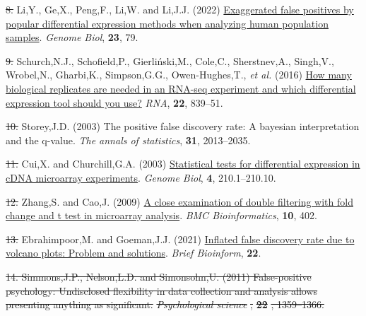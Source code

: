 \documentclass[
]{article}
\newlength{\cslhangindent}
\newenvironment{CSLReferences}[2] %
 {\begin{list}{}{%
  \setlength{\itemindent}{0pt}
  \setlength{\leftmargin}{0pt}
  \setlength{\parsep}{0pt}
  \ifodd #1
   \setlength{\leftmargin}{\cslhangindent}
   \setlength{\itemindent}{-1\cslhangindent}
  \fi
  \setlength{\itemsep}{#2\baselineskip}}}
 {\end{list}}
\providecommand{\DIFadd}[1]{{\protect\color{blue}\uwave{#1}}} %
\providecommand{\DIFdel}[1]{{\protect\color{red}\sout{#1}}}                      %
\providecommand{\DIFaddbegin}{} %
\providecommand{\DIFaddend}{} %
\providecommand{\DIFdelbegin}{} %
\providecommand{\DIFdelend}{} %
\newcommand{\DIFscaledelfig}{0.5}
\newlength{\DIFdelgraphicswidth} %
\newlength{\DIFdelgraphicsheight} %
\newcommand{\DIFaddincludegraphics}[2][]{{\color{blue}\fbox{\DIFOincludegraphics[#1]{#2}}}} %
\newcommand{\DIFdelincludegraphics}[2][]{%
\sbox{\DIFdelgraphicsbox}{\DIFOincludegraphics[#1]{#2}}%
\settoboxwidth{\DIFdelgraphicswidth}{\DIFdelgraphicsbox} %
\settoboxtotalheight{\DIFdelgraphicsheight}{\DIFdelgraphicsbox} %
\scalebox{\DIFscaledelfig}{%
\parbox[b]{\DIFdelgraphicswidth}{\usebox{\DIFdelgraphicsbox}\\[-\baselineskip] \rule{\DIFdelgraphicswidth}{0em}}\llap{\resizebox{\DIFdelgraphicswidth}{\DIFdelgraphicsheight}{%
\setlength{\unitlength}{\DIFdelgraphicswidth}%
\begin{picture}(1,1)%
\thicklines\linethickness{2pt} %
{\color[rgb]{1,0,0}\put(0,0){\framebox(1,1){}}}%
{\color[rgb]{1,0,0}\put(0,0){\line( 1,1){1}}}%
{\color[rgb]{1,0,0}\put(0,1){\line(1,-1){1}}}%
\end{picture}%
}\hspace*{3pt}}} %
} %
\DeclareRobustCommand{\DIFaddbegin}{\DIFOaddbegin \let\includegraphics\DIFaddincludegraphics} %
\DeclareRobustCommand{\DIFaddend}{\DIFOaddend \let\includegraphics\DIFOincludegraphics} %
\DeclareRobustCommand{\DIFdelbegin}{\DIFOdelbegin \let\includegraphics\DIFdelincludegraphics} %
\DeclareRobustCommand{\DIFdelend}{\DIFOaddend \let\includegraphics\DIFOincludegraphics} %
\begin{document}
\begin{CSLReferences}{1}{1}
\DIFdelbegin \DIFdel{8. }\DIFdelend \DIFaddbegin \DIFadd{13. }\DIFaddend Li,Y., Ge,X., Peng,F., Li,W. and Li,J.J. (2022)
\href{https://doi.org/10.1186/s13059-022-02648-4}{Exaggerated false
positives by popular differential expression methods when analyzing
human population samples}. \emph{Genome Biol}, \textbf{23}, 79.

\DIFdelbegin \DIFdel{9. }\DIFdelend \DIFaddbegin \DIFadd{14. }\DIFaddend Schurch,N.J., Schofield,P., Gierliński,M., Cole,C., Sherstnev,A.,
Singh,V., Wrobel,N., Gharbi,K., Simpson,G.G., Owen-Hughes,T., \emph{et
al.} (2016) \href{https://doi.org/10.1261/rna.053959.115}{How many
biological replicates are needed in an RNA-seq experiment and which
differential expression tool should you use?} \emph{RNA}, \textbf{22},
839--51.

\DIFdelbegin \DIFdel{10. }\DIFdelend \DIFaddbegin \DIFadd{15. }\DIFaddend Storey,J.D. (2003) The positive false discovery rate: A bayesian
interpretation and the q-value. \emph{The annals of statistics},
\textbf{31}, 2013--2035.

\DIFdelbegin \DIFdel{11. }\DIFdelend \DIFaddbegin \DIFadd{16. }\DIFaddend Cui,X. and Churchill,G.A. (2003)
\href{https://www.ncbi.nlm.nih.gov/pubmed/12702200}{Statistical tests
for differential expression in cDNA microarray experiments}.
\emph{Genome Biol}, \textbf{4}, 210.1--210.10.

\DIFdelbegin \DIFdel{12. }\DIFdelend \DIFaddbegin \DIFadd{17. }\DIFaddend Zhang,S. and Cao,J. (2009)
\href{https://doi.org/10.1186/1471-2105-10-402}{A close examination of
double filtering with fold change and t test in microarray analysis}.
\emph{BMC Bioinformatics}, \textbf{10}, 402.

\DIFdelbegin \DIFdel{13. }\DIFdelend \DIFaddbegin \DIFadd{18. }\DIFaddend Ebrahimpoor,M. and Goeman,J.J. (2021)
\href{https://doi.org/10.1093/bib/bbab053}{Inflated false discovery rate
due to volcano plots: Problem and solutions}. \emph{Brief Bioinform},
\textbf{22}.

\DIFdelbegin {}
\DIFdel{14. Simmons,J.P., Nelson,L.D. and Simonsohn,U. (2011) False-positive
psychology: Undisclosed flexibility in data collection and analysis
allows presenting anything as significant. }\emph{\DIFdel{Psychological science}}%
\DIFdel{,
}\textbf{\DIFdel{22}}%
\DIFdel{, 1359--1366.
}%


\end{CSLReferences}
\end{document}

